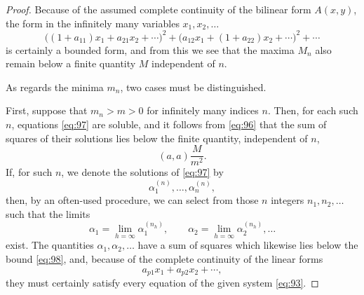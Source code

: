 \documentclass[b5paper,twoside]{article}
\newcommand{\originalpage}[1]{\phantomsection\label{origpage:#1}}
\begin{document}
\begin{proof}
Because of the assumed complete continuity of the bilinear form $A(x,y)$,
the form in the infinitely many variables $x_1,x_2,\ldots$
\[
  \bigl((1+a_{11})x_1+a_{21}x_2+\cdots\bigr)^2
  +\bigl(a_{12}x_1+(1+a_{22})x_2+\cdots\bigr)^2+\cdots
\]
is certainly a bounded form, and from this we see that the maxima $M_n$ also
remain below a finite quantity $M$ independent of $n$.

As regards the minima $m_n$, two cases must be distinguished.

First, suppose that $m_n>m>0$ for infinitely many indices $n$. Then, for each
such $n$, equations
\eqref{eq:97} are soluble, and it follows from \eqref{eq:96} that the sum of
squares of their solutions lies below the finite quantity, independent of
$n$,
\begin{equation}
  (a,a)\frac{M}{m^2}.
  \tag{98}\label{eq:98}
\end{equation}
If, for such $n$, we denote the solutions of \eqref{eq:97} by
\[
  \alpha_1^{(n)},\ldots,\alpha_n^{(n)},
\]
then, by an often-used procedure, we can select from those $n$ integers
$n_1,n_2,\ldots$ such
\originalpage{221}
that the limits
\[
  \alpha_1=\lim_{h=\infty}\alpha_1^{(n_h)},\qquad
  \alpha_2=\lim_{h=\infty}\alpha_2^{(n_h)},\ldots
\]
exist. The quantities $\alpha_1,\alpha_2,\ldots$ have a sum of squares which
likewise lies below the bound \eqref{eq:98}, and, because of the complete
continuity of the linear forms
\[
  a_{p1}x_1+a_{p2}x_2+\cdots,
\]
they must certainly satisfy every equation of the given system
\eqref{eq:93}.


\end{proof}
\end{document}

